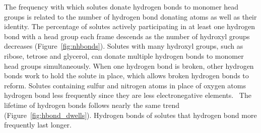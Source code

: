 \documentclass{article}
\begin{document}
  The frequency with which solutes donate hydrogen bonds to monomer head 
  groups is related to the number of hydrogen bond donating atoms as well
  as their identity. The percentage of solutes actively participating in
  at least one hydrogen bond with a head group each frame descends as the
  number of hydroxyl groups decreases (Figure~\ref{fig:nhbonds}). Solutes
  with many hydroxyl groups, such as ribose, tetrose and glycerol, can 
  donate multiple hydrogen bonds to monomer head groups simultaneously. 
  When one hydrogen bond is broken, other hydrogen bonds work to hold the
  solute in place, which allows broken hydrogen bonds to reform. Solutes 
  containing sulfur and nitrogen atoms in place of oxygen atoms hydrogen
  bond less frequently since they are less electronegative elements.~\cite{biswal_hydrogen_2015} %
  The lifetime of hydrogen bonds follows nearly the same trend 
  (Figure~\ref{fig:hbond_dwells}). Hydrogen bonds of solutes that hydrogen
  bond more frequently last longer.
  
\end{document}
